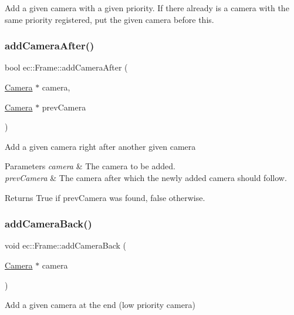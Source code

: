 Add a given camera with a given priority. If there already is a camera with the same priority registered, put the given camera before this. \mbox{\label{classec_1_1_frame_a60b34025921413dd3ea92c9146d76825}} 
\subsubsection{\texorpdfstring{add\+Camera\+After()}{addCameraAfter()}}
{\footnotesize\ttfamily bool ec\+::\+Frame\+::add\+Camera\+After (\begin{DoxyParamCaption}\item[{\mbox{\hyperlink{classec_1_1_camera}{Camera}} $\ast$}]{camera,  }\item[{\mbox{\hyperlink{classec_1_1_camera}{Camera}} $\ast$}]{prev\+Camera }\end{DoxyParamCaption})}

Add a given camera right after another given camera 
\begin{DoxyParams}{Parameters}
{\em camera} & The camera to be added. \\
\hline
{\em prev\+Camera} & The camera after which the newly added camera should follow. \\
\hline
\end{DoxyParams}
\begin{DoxyReturn}{Returns}
True if prev\+Camera was found, false otherwise. 
\end{DoxyReturn}
\mbox{\label{classec_1_1_frame_a1cfcb26e088e6f6b07103af8ac9d3bfa}} 
\subsubsection{\texorpdfstring{add\+Camera\+Back()}{addCameraBack()}}
{\footnotesize\ttfamily void ec\+::\+Frame\+::add\+Camera\+Back (\begin{DoxyParamCaption}\item[{\mbox{\hyperlink{classec_1_1_camera}{Camera}} $\ast$}]{camera }\end{DoxyParamCaption})}

Add a given camera at the end (low priority camera) \mbox{\label{classec_1_1_frame_af1f1769a61f70a756fd762d80a676063}} 
